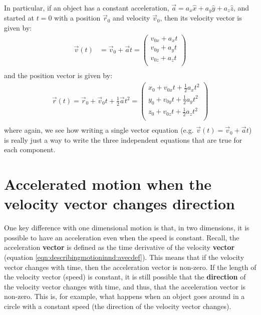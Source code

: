 In particular, if an object has a constant acceleration, $\vec a=a_x\hat x+a_y\hat y+a_z\hat z$, and started at $t=0$ with a position $\vec r_0$ and velocity $\vec v_0$, then its velocity vector is given by:
\begin{align*}
\vec v(t)  &= \vec v_0+\vec at=\begin{pmatrix}
           v_{0x}+ a_xt \\
           v_{0y}+ a_yt \\
           v_{0z}+ a_zt \\
         \end{pmatrix}\\
\end{align*}
and the position vector is given by:
\begin{align*}
\vec r(t)= \vec r_0+\vec v_0 t+\frac{1}{2}\vec a t^2=\begin{pmatrix}
           x_0+v_{0x}t+\frac{1}{2} a_xt^2 \\
           y_0+v_{0y}t+\frac{1}{2} a_yt^2 \\
           z_0+v_{0z}t+\frac{1}{2} a_zt^2 \\
         \end{pmatrix}\\
\end{align*}
where again, we see how writing a single vector equation (e.g. $\vec v(t) = \vec v_0+\vec at$) is really just a way to write the three independent equations that are true for each component.

\section{Accelerated motion when the velocity vector changes direction}
\label{sec:describingmotioninnd:accvconst}
One key difference with one dimensional motion is that, in two dimensions, it is possible to have an acceleration even when the speed is constant. Recall, the acceleration \textbf{vector} is defined as the time derivative of the velocity \textbf{vector} (equation \ref{eqn:describingmotioninnd:avecdef}). This means that if the velocity vector changes with time, then the acceleration vector is non-zero. If the length of the velocity vector (speed) is constant, it is still possible that the \textbf{direction} of the velocity vector changes with time, and thus, that the acceleration vector is non-zero. This is, for example, what happens when an object goes around in a circle with a constant speed (the direction of the velocity vector changes). 

